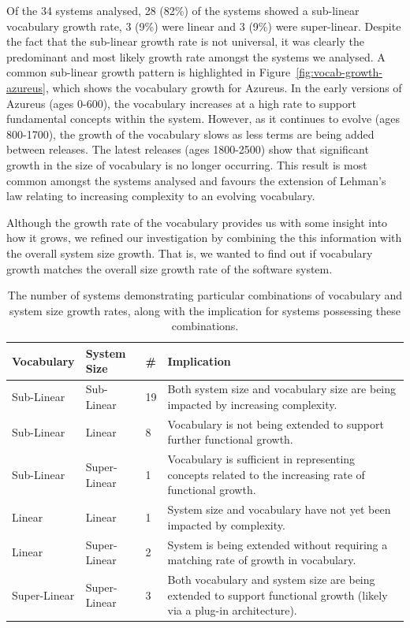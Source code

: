 Of the 34 systems analysed, 28 (82\%) of the systems showed a sub-linear vocabulary growth rate, 3 (9\%) were linear and 3 (9\%) were super-linear. Despite the fact that the sub-linear growth rate is not universal, it was clearly the predominant and most likely growth rate amongst the systems we analysed. A common sub-linear growth pattern is highlighted in Figure~\ref{fig:vocab-growth-azureus}, which shows the vocabulary growth for Azureus. In the early versions of Azureus (ages 0-600), the vocabulary increases at a high rate to support fundamental concepts within the system. However, as it continues to evolve (ages 800-1700), the growth of the vocabulary slows as less terms are being added between releases. The latest releases (ages 1800-2500) show that significant growth in the size of vocabulary is no longer occurring. This result is most common amongst the systems analysed and favours the extension of Lehman's law relating to increasing complexity to an evolving vocabulary.

Although the growth rate of the vocabulary provides us with some insight into how it grows,
we refined our investigation by combining the this information with the overall system size growth. That is, we wanted to find out if vocabulary growth matches the overall size growth rate of the software system.

\begin{table}[t]
\centering
\begin{tabular}{|p{}|p{}|p{}|p{}|}
\hline
{\bf Vocabulary} & {\bf System Size} & {\bf \#} & {\bf Implication} \\
\hline
\hline
Sub-Linear
&
Sub-Linear
&
19
&
Both system size and vocabulary size are being impacted by increasing complexity.
\\
\hline
Sub-Linear
&
Linear
&
8
&
Vocabulary is not being extended to support further functional growth.
\\
\hline
Sub-Linear
&
Super-Linear
&
1
&
Vocabulary is sufficient in representing concepts related to the increasing rate of functional growth.
\\
\hline
Linear
&
Linear
&
1
&
System size and vocabulary have not yet been impacted by complexity.
\\
\hline
Linear
&
Super-Linear
&
2
&
System is being extended without requiring a matching rate of growth in vocabulary.
\\
\hline
Super-Linear
&
Super-Linear
&
3
&
Both vocabulary and system size are being extended to support functional growth (likely via a plug-in architecture).
\\
\hline
\end{tabular}
\vspace{0.2cm}
\caption{The number of systems demonstrating particular combinations of vocabulary and system size growth rates, along with the implication for systems possessing these combinations.}
\label{tab:growth_rate_results}
\vspace{-0.2cm}
\end{table}

